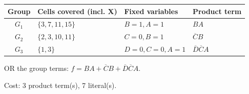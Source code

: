 \documentclass[a4paper,11pt]{article}
\begin{document}
\begin{minipage}{\textwidth}
\begin{center}\small
\begin{tabular}{clll}
\toprule
Group & Cells covered (incl. X) & Fixed variables & Product term\\\midrule
\textcolor{blue!75!black}{$G_{1}$} & $\{3,7,11,15\}$ & $B=1,A=1$ & $BA$\\
\textcolor{red!75!black}{$G_{2}$} & $\{2,3,10,11\}$ & $C=0,B=1$ & $\overline{C}B$\\
\textcolor{teal!80!black}{$G_{3}$} & $\{1,3\}$ & $D=0,C=0,A=1$ & $\overline{D}\overline{C}A$\\
\bottomrule\end{tabular}\end{center}


\noindent OR the group terms: $\boxed{f=BA + \overline{C}B + \overline{D}\overline{C}A}$.

\noindent Cost: 3 product term(s), 7 literal(s).

\end{minipage}\par\vspace{0.25cm}

\clearpage
\end{document}
